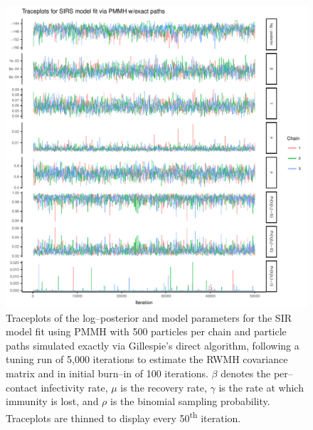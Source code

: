 \begin{figure}[htbp]
	\centering
	\includegraphics[width=0.9\linewidth]{figures/sirs_pomp_exact_traceplots}
	\caption[Simulation 1 MCMC traceplots for an SIRS model fit using PMMH with exact particle paths with 500 particles per chain.]{Traceplots of the log--posterior and model parameters for the SIR model fit using PMMH with 500 particles per chain and particle paths simulated exactly via Gillespie's direct algorithm, following a tuning run of 5,000 iterations to estimate the RWMH covariance matrix and in initial burn--in of 100 iterations. $ \beta $ denotes the per--contact infectivity rate, $ \mu $ is the recovery rate, $\gamma$ is the rate at which immunity is lost, and $ \rho $ is the binomial sampling probability. Traceplots are thinned to display every 50\textsuperscript{th} iteration.}
	\label{fig:sirspompexacttraceplots}
\end{figure}

